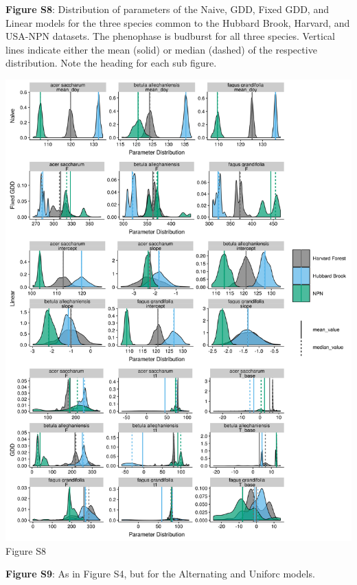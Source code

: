 \documentclass[a4paper,12pt]{article}
\begin{document}
\newpage

\textbf{Figure S8}: Distribution of parameters of the Naive, GDD, Fixed GDD, and Linear models for the three species common to the Hubbard Brook, Harvard, and USA-NPN datasets. The phenophase is budburst for all three species. Vertical lines indicate either the mean (solid) or median (dashed) of the respective distribution. Note the heading for each sub figure. 

\newpage

\begin{center}
	\centering
		\includegraphics[scale=0.5]{supplement_hubbard_harvard_comparison1.png}
	Figure S8
\end{center}

\newpage

\textbf{Figure S9}: As in Figure S4, but for the Alternating and Uniforc models. 
\end{document}
